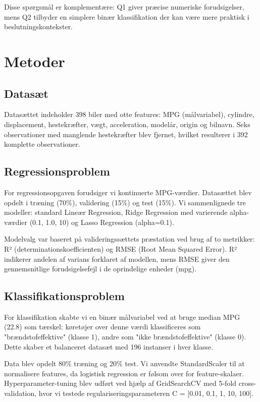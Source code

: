 \documentclass[a4paper, twocolumn]{article}
\begin{document}
Disse spørgsmål er komplementære: Q1 giver præcise numeriske forudsigelser, mens Q2 tilbyder en simplere binær klassifikation der kan være mere praktisk i beslutningskontekster.

\section{Metoder}
\label{sec:methods}

\subsection{Datasæt}
Datasættet indeholder 398 biler med otte features: MPG (målvariabel), cylindre, displacement, hestekræfter, vægt, acceleration, modelår, origin og bilnavn. Seks observationer med manglende hestekræfter blev fjernet, hvilket resulterer i 392 komplette observationer.

\subsection{Regressionsproblem}
For regressionsopgaven forudsiger vi kontinuerte MPG-værdier. Datasættet blev opdelt i træning (70\%), validering (15\%) og test (15\%). Vi sammenlignede tre modeller: standard Lineær Regression, Ridge Regression med varierende alpha-værdier (0.1, 1.0, 10) og Lasso Regression (alpha=0.1).

Modelvalg var baseret på valideringssættets præstation ved brug af to metrikker: R² (determinationskoefficienten) og RMSE (Root Mean Squared Error). R² indikerer andelen af varians forklaret af modellen, mens RMSE giver den gennemsnitlige forudsigelsefejl i de oprindelige enheder (mpg).

\subsection{Klassifikationsproblem}
For klassifikation skabte vi en binær målvariabel ved at bruge median MPG (22.8) som tærskel: køretøjer over denne værdi klassificeres som "brændstofeffektive" (klasse 1), andre som "ikke brændstofeffektive" (klasse 0). Dette skaber et balanceret datasæt med 196 instanser i hver klasse.

Data blev opdelt 80\% træning og 20\% test. Vi anvendte StandardScaler til at normalisere features, da logistisk regression er følsom over for feature-skalaer. Hyperparameter-tuning blev udført ved hjælp af GridSearchCV med 5-fold cross-validation, hvor vi testede regulariseringsparameteren C = [0.01, 0.1, 1, 10, 100].
\end{document}

